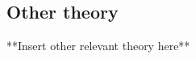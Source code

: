 \subsection{Other theory}\label{subsec:theory_aSubsection}

**Insert other relevant theory here**



